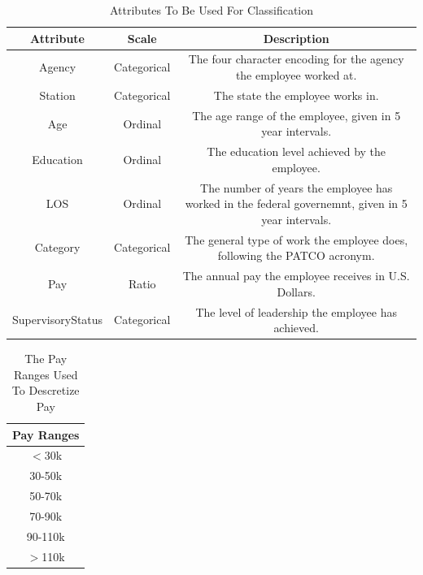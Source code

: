 \documentclass{article}
\begin{document}
    \begin{center}
        \begin{table}
            \centering
            \begin{tabular}{ |c|c|c| }
                \hline
                Attribute & Scale & Description \\
                \hline
                Agency & Categorical & The four character encoding for the agency the employee worked at. \\
                Station & Categorical & The state the employee works in. \\
                Age & Ordinal & The age range of the employee, given in 5 year intervals. \\
                Education & Ordinal & The education level achieved by the employee. \\
                LOS & Ordinal & The number of years the employee has worked in the federal governemnt, given in 5 year intervals. \\
                Category & Categorical & The general type of work the employee does, following the PATCO acronym. \\
                Pay & Ratio & The annual pay the employee receives in U.S. Dollars. \\
                SupervisoryStatus & Categorical & The level of leadership the employee has achieved. \\
                \hline
            \end{tabular}
            \caption{Attributes To Be Used For Classification}
            \label{tab:1}
        \end{table}
    \end{center}

    \begin{center}
        \begin{table}
            \centering
            \begin{tabular}{ |c| }
                \hline
                Pay Ranges \\
                \hline
                $<$30k \\
                30-50k \\
                50-70k \\
                70-90k \\
                90-110k \\
                $>$110k \\
                \hline
            \end{tabular}
            \caption{The Pay Ranges Used To Descretize Pay}
            \label{tab:2}
        \end{table}
    \end{center}
\end{document}
